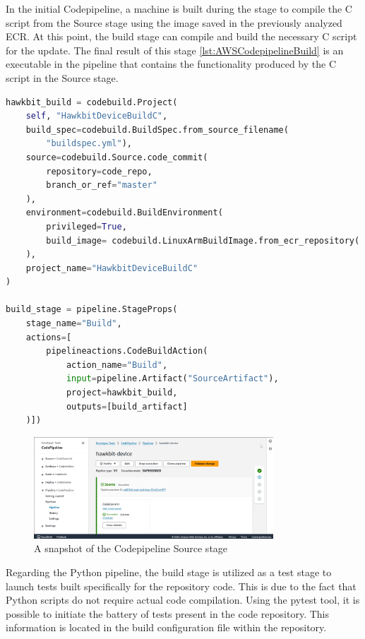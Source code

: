 In the initial Codepipeline, a machine is built during the stage to compile the C script from the Source stage using the image saved in the previously analyzed ECR. At this point, the build stage can compile and build the necessary C script for the update. The final result of this stage \ref{lst:AWSCodepipelineBuild} is an executable in the pipeline that contains the functionality produced by the C script in the Source stage.
\begin{lstlisting}[language=Python, caption={CDK Code for the Codecommit build stage set up}, label=lst:AWSCodepipelineBuild]
hawkbit_build = codebuild.Project(
    self, "HawkbitDeviceBuildC",
    build_spec=codebuild.BuildSpec.from_source_filename(
        "buildspec.yml"),
    source=codebuild.Source.code_commit(
        repository=code_repo,
        branch_or_ref="master"
    ),
    environment=codebuild.BuildEnvironment(
        privileged=True,
        build_image= codebuild.LinuxArmBuildImage.from_ecr_repository( ecr_repository, "v1")
    ),
    project_name="HawkbitDeviceBuildC"
)

build_stage = pipeline.StageProps(
    stage_name="Build",
    actions=[
        pipelineactions.CodeBuildAction(
            action_name="Build",
            input=pipeline.Artifact("SourceArtifact"),
            project=hawkbit_build,
            outputs=[build_artifact]
    )])
\end{lstlisting}
\begin{figure}[h]  %
    \centering
    \includegraphics[width=0.8\textwidth]{images/hawkbitCodepipeline.png}  %
    \caption{A snapshot of the Codepipeline Source stage}
    \label{fig:HawkbitCodepipeline}
\end{figure}

Regarding the Python pipeline, the build stage is utilized as a test stage to launch tests built specifically for the repository code. This is due to the fact that Python scripts do not require actual code compilation. Using the pytest tool, it is possible to initiate the battery of tests present in the code repository. This information is located in the build configuration file within the repository.

